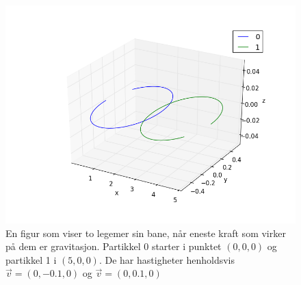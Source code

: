 \documentclass[11pt]{article}
\begin{document}
\begin{figure}[!h]
  \centering
  \includegraphics[scale=0.4]{../fig/2body.png}
  \caption{\label{fig:2body} En figur som viser to legemer sin bane, når eneste
    kraft som virker på dem er gravitasjon. Partikkel 0 starter i 
    punktet $(0,0,0)$ og partikkel 1 i $(5,0,0)$. De har hastigheter 
    henholdsvis $\vec{v} = (0, -0.1, 0) $ og $\vec{v} = (0, 0.1, 0)$  }
\end{figure}
\end{document}
